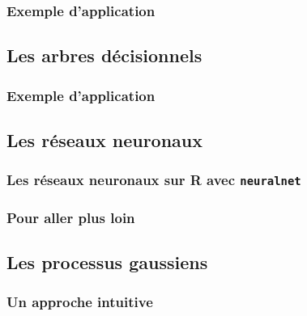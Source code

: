 \documentclass[]{book}
\begin{document}
\hypertarget{exemple-dapplication-1}{%
\subsubsection{Exemple d'application}\label{exemple-dapplication-1}}

\hypertarget{les-arbres-duxe9cisionnels}{%
\subsection{Les arbres décisionnels}\label{les-arbres-duxe9cisionnels}}

\hypertarget{exemple-dapplication-2}{%
\subsubsection{Exemple d'application}\label{exemple-dapplication-2}}

\hypertarget{les-ruxe9seaux-neuronaux}{%
\subsection{Les réseaux neuronaux}\label{les-ruxe9seaux-neuronaux}}

\hypertarget{les-ruxe9seaux-neuronaux-sur-r-avec-neuralnet}{%
\subsubsection{\texorpdfstring{Les réseaux neuronaux sur R avec
\textbf{\texttt{neuralnet}}}{Les réseaux neuronaux sur R avec neuralnet}}\label{les-ruxe9seaux-neuronaux-sur-r-avec-neuralnet}}

\hypertarget{pour-aller-plus-loin-1}{%
\subsubsection{Pour aller plus loin}\label{pour-aller-plus-loin-1}}

\hypertarget{les-processus-gaussiens}{%
\subsection{Les processus gaussiens}\label{les-processus-gaussiens}}

\hypertarget{un-approche-intuitive}{%
\subsubsection{Un approche intuitive}\label{un-approche-intuitive}}
\end{document}
